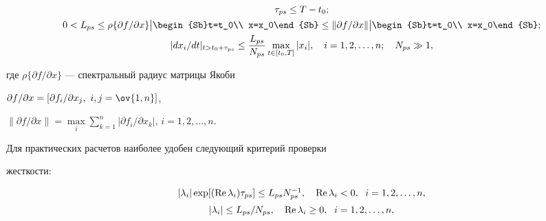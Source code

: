 \begin{gather*} 


\tau_{ps}\le T-t_0;\\ 


% 


0<L_{ps}\le\rho\{\partial f/\partial x\} 


\big|\begin{Sb}t=t_0\\ x=x_0\end{Sb}\le 


\|\partial f/\partial x\| 


\big|\begin{Sb}t=t_0\\ x=x_0\end{Sb};\\ 


% 


|dx_i/dt|_{t>t_0+\tau_{ps}}\le\frac{L_{ps}}{N_{ps}} 


\max_{t\in[t_0,T]}|x_i|,\quad i=1,2,\dotsc,n;\quad 


N_{ps}\gg 1, 


\end{gather*} 


где $\rho\{\partial f/\partial x\}$ --- спектральный радиус матрицы Якоби 


$\partial f/\partial x=[\partial f_i/\partial x_j,\ i,j=\ov{1,n}]$, 


$\|\partial f/\partial x\|=\max\limits_i\sum\limits^n_{k=1}|\partial 


f_i/\partial x_k|$, $i=1,2,\dotsc,n$. 


 


Для практических расчетов наиболее удобен следующий критерий проверки 


жесткости: 


\begin{equation} 


\begin{array}{c} 


|\lambda_i|\exp[(\re\lambda_i)\tau_{ps}]\le L_{ps} 


N^{-1}_{ps},\quad \re\lambda_i<0,\ \; i=1,2,\dotsc,n,\\[2mm]


|\lambda_i|\le L_{ps}/N_{ps},\quad\re\lambda_i\ge0,\ \; i=1,2,\dotsc,n, 


\end{array} 


\end{equation} 


